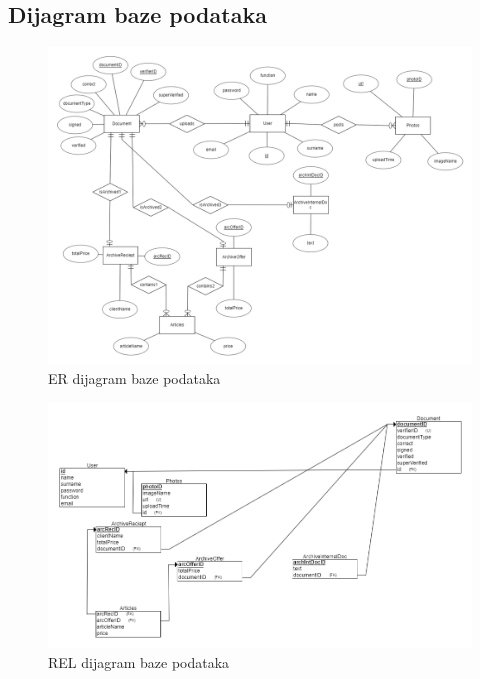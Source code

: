 			\subsection{Dijagram baze podataka}
				
				\begin{figure}[H]
					\includegraphics[scale=0.6]{slike/kompletici_v2_ER.PNG} %
					\centering
					\caption{ER dijagram baze podataka}
					\label{fig:promjene}
				\end{figure}
				
					\begin{figure}[H]
					\includegraphics[scale=0.5]{slike/kompletici_v2_REL.PNG} %
					\centering
					\caption{REL dijagram baze podataka}
					\label{fig:promjene}
				\end{figure}
				
